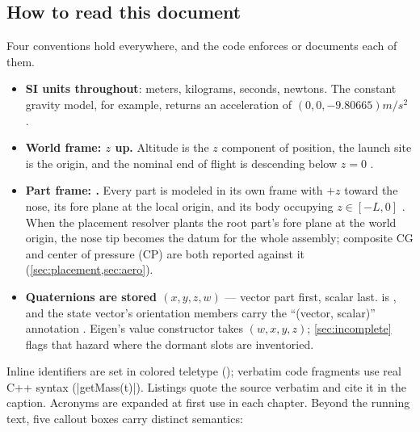 \subsection{How to read this document}\label{sec:intro-reading}

Four conventions hold everywhere, and the code enforces or documents each of them.

\begin{itemize}
\item \textbf{SI units throughout}: meters, kilograms, seconds, newtons. The constant
  gravity model, for example, returns an acceleration of $(0, 0, -9.80665)\unit{m/s^2}$
  .
\item \textbf{World frame: $z$ up.} Altitude is the $z$ component of position, the launch
  site is the origin, and the nominal end of flight is descending below $z = 0$
  .
\item \textbf{Part frame: \zfwd.} Every part is modeled in its own frame with $+z$ toward
  the nose, its fore plane at the local origin, and its body occupying
  $z \in [-L, 0]$ . When the placement resolver plants the root
  part's fore plane at the world origin, the nose tip becomes the datum for the whole
  assembly; composite CG and center of pressure (CP) are both reported against it
  (\cref{sec:placement,sec:aero}).
\item \textbf{Quaternions are stored $(x, y, z, w)$} --- vector part first, scalar last.
   is  , and the
  state vector's orientation members carry the ``(vector, scalar)'' annotation
  . Eigen's value constructor takes $(w, x, y, z)$;
  \cref{sec:incomplete} flags that hazard where the dormant slots are inventoried.
\end{itemize}

Inline identifiers are set in colored teletype (); verbatim code
fragments use real C++ syntax (\cppinline|getMass(t)|). Listings quote the source verbatim
and cite it in the caption. Acronyms are expanded at first use in each chapter. Beyond the
running text, five callout boxes carry distinct semantics:

